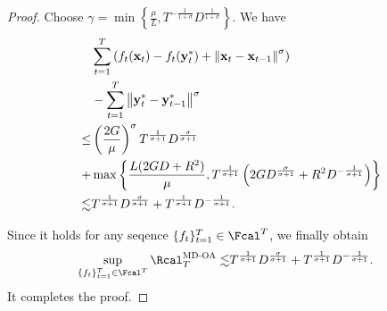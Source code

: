 \documentclass[journal]{IEEEtran}
\begin{document}
\begin{proof}
Choose $\gamma = \min \left\{ \frac{\mu}{L}, T^{-\frac{1}{1+\sigma}} D^{\frac{1}{1+\sigma}} \right\}$. We have
\begin{align}
\nonumber
&\sum_{t=1}^T \left( f_t({\bf x}_t) - f_t({\bf y}_t^{\ast}) + \left\lVert{\bf x}_t - {\bf x}_{t-1}\right\rVert^{\sigma}  \right) \\ \nonumber
& - \sum_{t=1}^T \left\lVert{\bf y}_t^\ast - {\bf y}_{t-1}^\ast\right\rVert^{\sigma}  \\ \nonumber 
\le  & \left( \frac{2 G }{\mu} \right)^{\sigma} T^{\frac{1}{\sigma+1}}D^{\frac{\sigma}{\sigma+1}} \\ \nonumber
+ &\max\left\{  \frac{L(2GD + R^2)}{\mu}, T^{\frac{1}{\sigma+1}} \left( 2G D^{\frac{\sigma}{\sigma+1}} + R^2 D^{-\frac{1}{\sigma+1}}  \right) \right\}\\ \nonumber
\lesssim & T^{\frac{1}{\sigma+1}}D^{\frac{\sigma}{\sigma+1}} + T^{\frac{1}{\sigma+1}} D^{-\frac{1}{\sigma+1}}.
\end{align} 

Since it holds for any seqence $\{f_t\}_{t=1}^T \in \Fcal^T$, we finally obtain
\begin{align}
\nonumber
\sup_{\{f_t\}_{t=1}^T \in \Fcal^T}\Rcal_T^{\textsc{MD-OA}}
\lesssim & T^{\frac{1}{\sigma+1}}D^{\frac{\sigma}{\sigma+1}} + T^{\frac{1}{\sigma+1}} D^{-\frac{1}{\sigma+1}}.
\end{align} 
It completes the proof.
\end{proof}
\end{document}
